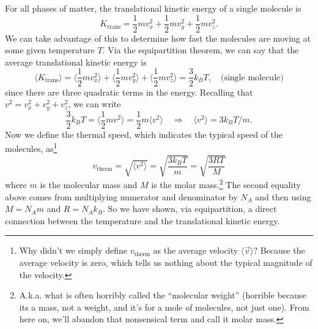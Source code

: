 For all phases of matter,  the translational kinetic
energy of a single molecule is
\begin{equation}
K_\text{trans} = {\textstyle\frac{1}{2}} m v_x^2 + 
{\textstyle\frac{1}{2}} m v_y^2 + {\textstyle\frac{1}{2}} m v_z^2.
\label{eq:k_molecule}
\end{equation}
We can take advantage of this to determine how fast the molecules are
moving at some given temperature $T$.
Via the equipartition theorem, we can say that the average
translational kinetic energy is
\begin{equation}
\langle K_\text{trans}\bigr\rangle = \textstyle
  \bigl\langle\frac{1}{2}mv_x^2\bigr\rangle 
  +\bigl\langle\frac{1}{2}mv_y^2\bigr\rangle 
  +\bigl\langle\frac{1}{2}mv_z^2\bigr\rangle 
= \frac{3}{2}k_BT,   \quad\text{(single molecule)}
\end{equation}
since there are three quadratic terms in the energy.  Recalling that
$v^2=v_x^2+v_y^2+v_z^2$, we can write
\begin{equation}
  \frac{3}{2}k_BT = \textstyle\bigl\langle \frac{1}{2}mv^2\bigr\rangle = 
  \frac{1}{2}m\langle v^2\rangle \quad\Rightarrow\quad
  \langle v^2\rangle = 3 k_B T/m.
\end{equation}
Now we define the thermal speed, which indicates the typical speed of
the molecules, as\footnote{Why didn't we simply define
  $v_\text{therm}$ as the average velocity $\langle \vec v\rangle$?
  Because the average velocity is zero, which tells us nothing about
  the typical magnitude of the velocity.}
\begin{equation}
  v_\text{therm} =  \sqrt{\langle v^2\rangle}= \sqrt{\frac{3k_BT}{m}} = 
  \sqrt{\frac{3RT}{M}}
\label{eq:v_thermal}
\end{equation}
where $m$ is the molecular mass and $M$ is the molar
mass.\footnote{A.k.a. what is often horribly called the ``molecular
  weight'' (horrible because its a mass, not a weight, and it's for a
  mole of molecules, not just one).  From here on, we'll abandon that
  nonsensical term and call it molar mass.} The second equality above
comes from multiplying numerator and denominator by $N_A$ and then
using $M = N_A m$ and $R=N_Ak_B$.  So we have shown, via
equipartition, a direct connection between the temperature and the
translational kinetic energy.


